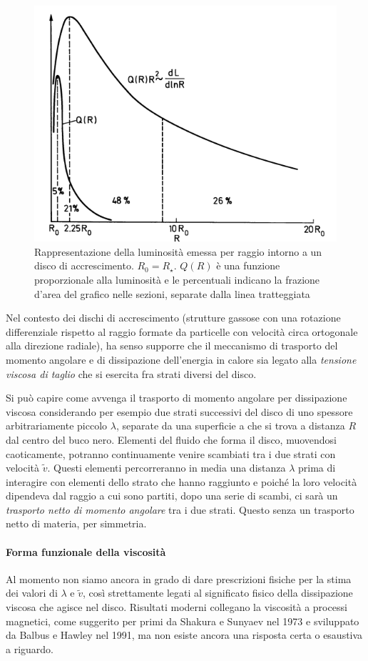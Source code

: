 \documentclass[a4paperbi]{article}
\begin{document}
	\begin{figure}[H]
		\centering
		\includegraphics[width=0.8\linewidth]{LuminositaRaggio}
		\caption{Rappresentazione della luminosità emessa per raggio intorno a un disco di accrescimento. $R_0=R_\star$. $Q(R)$ è una funzione proporzionale alla luminosità e le percentuali indicano la frazione d'area del grafico nelle sezioni, separate dalla linea tratteggiata}
		\label{fig:LuminositaRaggio}
	\end{figure}

	Nel contesto dei dischi di accrescimento (strutture gassose con una rotazione differenziale rispetto al raggio formate da particelle con velocità circa ortogonale alla direzione radiale), ha senso supporre che il meccanismo di trasporto del momento angolare e di dissipazione dell'energia in calore sia legato alla \textit{tensione viscosa di taglio} che si esercita fra strati diversi del disco.	

	Si può capire come avvenga il trasporto di momento angolare per dissipazione viscosa considerando per esempio due strati successivi del disco di uno spessore arbitrariamente piccolo $\lambda$, separate da una superficie a che si trova a distanza $R$ dal centro del buco nero. Elementi del fluido che forma il disco, muovendosi caoticamente, potranno continuamente venire scambiati tra i due strati con velocità $\tilde{v}$. Questi elementi percorreranno in media una distanza $\lambda$ prima di interagire con elementi dello strato che hanno raggiunto e poiché la loro velocità dipendeva dal raggio a cui sono partiti, dopo una serie di scambi, ci sarà un \textit{trasporto netto di momento angolare} tra i due strati. Questo senza un trasporto netto di materia, per simmetria.

	\paragraph{Forma funzionale della viscosità}	
	Al momento non siamo ancora in grado di dare prescrizioni fisiche per la stima dei valori di $\lambda$ e $\tilde{v}$, così strettamente legati al significato fisico della dissipazione viscosa che agisce nel disco. Risultati moderni collegano la viscosità a processi magnetici, come suggerito per primi da Shakura e Sunyaev nel 1973 e sviluppato da Balbus e Hawley nel 1991, ma non esiste ancora una risposta certa o esaustiva a riguardo. 
	
\end{document}
